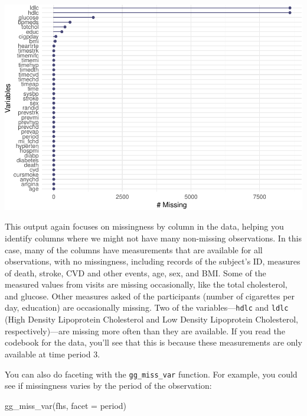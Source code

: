 \documentclass[
]{book}
\newenvironment{Shaded}{\begin{snugshade}}{\end{snugshade}}
\newcommand{\AttributeTok}[1]{\textcolor[rgb]{0.77,0.63,0.00}{#1}}
\newcommand{\FunctionTok}[1]{\textcolor[rgb]{0.00,0.00,0.00}{#1}}
\newcommand{\NormalTok}[1]{#1}
\begin{document}
\includegraphics{adv_epi_analysis_files/figure-latex/unnamed-chunk-174-1.pdf}

This output again focuses on missingness by column in the data, helping you identify columns where we might not have many non-missing observations.
In this case, many of the columns have measurements that are available for all observations, with no missingness,
including records of the subject's ID, measures of death, stroke, CVD and other
events, age, sex, and BMI. Some of the measured values from visits are missing
occasionally, like the total cholesterol, and glucose. Other measures asked of
the participants (number of cigarettes per day, education) are occasionally
missing. Two of the variables---\texttt{hdlc} and \texttt{ldlc} (High Density Lipoprotein Cholesterol and Low Density Lipoprotein Cholesterol, respectively)---are missing more often than
they are available. If you read the codebook for the data, you'll see that this is because these measurements are only available at time period 3.

You can also do faceting with the \texttt{gg\_miss\_var} function. For
example, you could see if missingness varies by the period of the observation:

\begin{Shaded}
\begin{Highlighting}[]
\FunctionTok{gg\_miss\_var}\NormalTok{(fhs, }\AttributeTok{facet =}\NormalTok{ period)}
\end{Highlighting}
\end{Shaded}
\end{document}

